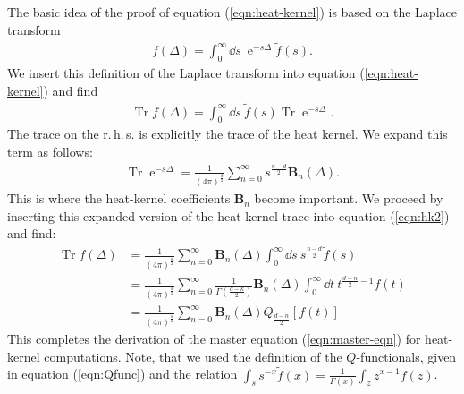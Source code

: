 The basic idea of the proof of equation (\ref{eqn:heat-kernel}) is based on the Laplace transform
\begin{align}
	f(\Delta) = \int_0^{\infty} \dd s \ \operatorname{e}^{-s\Delta}\tilde{f}(s).
\end{align}
We insert this definition of the Laplace transform into equation (\ref{eqn:heat-kernel}) and find
\begin{align}
	\operatorname{Tr} f(\Delta)=\int_{0}^{\infty} \dd s \ \tilde{f}(s) \operatorname{Tr} \operatorname{e}^{-s \Delta}.
\label{eqn:hk2}
\end{align}
The trace on the r.\,h.\,s. is explicitly the trace of the heat kernel. We expand this term as follows:
\begin{align}
	\operatorname{Tr} \operatorname{e}^{-s \Delta}=\frac{1}{(4 \pi)^{\frac{d}{2}}} \sum_{n=0}^{\infty} s^{\frac{n-d}{2}} \mathbf{B}_{n}(\Delta).
\end{align}
This is where the heat-kernel coefficients $\mathbf{B}_n$ become important. We proceed by inserting this expanded version of the heat-kernel trace into equation (\ref{eqn:hk2}) and find:
\begin{equation}
\begin{aligned} 
\operatorname{Tr} f(\Delta) &=\frac{1}{(4 \pi)^{\frac{d}{2}}} \sum_{n=0}^{\infty} \mathbf{B}_{n}(\Delta) \int_{0}^{\infty} \dd s \ s^{\frac{n-d}{2}} \tilde{f}(s) \\[10pt] 
&=\frac{1}{(4 \pi)^{\frac{d}{2}}} \sum_{n=0}^{\infty} \frac{1}{\Gamma\left(\frac{d-k}{2}\right)} \mathbf{B}_{n}(\Delta) \int_{0}^{\infty} \dd t \ t^{\frac{d-n}{2}-1} f(t) \\[10pt]
 &=\frac{1}{(4 \pi)^{\frac{d}{2}}} \sum_{n=0}^{\infty} \mathbf{B}_{n}(\Delta) Q_{\frac{d-n}{2}}[f(t)] 
\end{aligned}
\end{equation}
This completes the derivation of the master equation (\ref{eqn:master-eqn}) for heat-kernel computations. Note, that we used the definition of the $Q$-functionals, given in equation (\ref{eqn:Qfunc}) and the relation $\int_{s} s^{-x} \tilde{f}(x)=\frac{1}{\Gamma(x)} \int_{z} z^{x-1} f(z)$.


